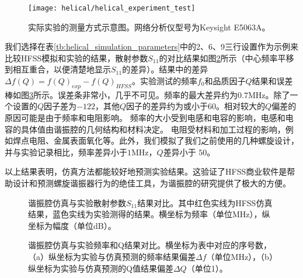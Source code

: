\begin{figure}
    \centering
    \caption[实际实验的测量方式示意图]{实际实验的测量方式示意图。网络分析仪型号为Keysight E5063A。\label{fig:helical_experiment_test}}
    \texttt{[image: helical/helical\_experiment\_test]}
\end{figure}

我们选择在表\ref{tb:helical_simulation_parameters}中的2、6、9三行设置作为示例来比较HFSS模拟和实验的结果，散射参数$S_{11}$的对比结果如图\ref{fig:helical_compares}所示（中心频率平移到相互重合，以便清楚地显示$S_{11}$的差异）。结果中的差异$\Delta f(Q)=f(Q)_{exp}-f(Q)_{HFSS}$。实验测试的频率$f_0$和品质因子$Q$结果和误差棒如图\ref{fig:helical_compares_f_q}所示。误差条非常小，几乎不可见。频率的最大差异约为$0.7$MHz。除了一个设置的$Q$因子差为$-122$，其他$Q$因子的差异约为或小于$60$。相对较大的$Q$偏差的原因可能是由于频率和电阻影响。
频率的大小受到电感和电容的影响，电感和电容的具体值由谐振腔的几何结构和材料决定。
电阻受材料和加工过程的影响，例如焊点电阻、金属表面氧化等。此外，我们模拟了我们之前使用的几种螺旋设计，并与实验记录相比，频率差异小于$1$MHz，$Q$差异小于 $50$。

以上结果表明，仿真方法都能较好地预测实验结果。这验证了HFSS商业软件是帮助设计和预测螺旋谐振器行为的绝佳工具，为谐振腔的研究提供了极大的方便。

\begin{figure}
    \centering
    \caption[谐振腔仿真与实验散射参数结果对比]{谐振腔仿真与实验散射参数$S_{11}$结果对比。其中红色实线为HFSS仿真结果，蓝色实线为实验测得的结果。横坐标为频率（单位MHz），纵坐标为幅度（单位dB）。\label{fig:helical_compares}}
\end{figure}


\begin{figure}
    \centering
    \caption[谐振腔仿真与实验频率和Q结果对比]{谐振腔仿真与实验频率和Q结果对比。横坐标为表中对应的序号数，（a）纵坐标为实验与仿真预测的频率结果偏差$\Delta f$（单位MHz），（b）纵坐标为实验与仿真预测的Q值结果偏差$\Delta Q$（单位1）。\label{fig:helical_compares_f_q}}
\end{figure}

